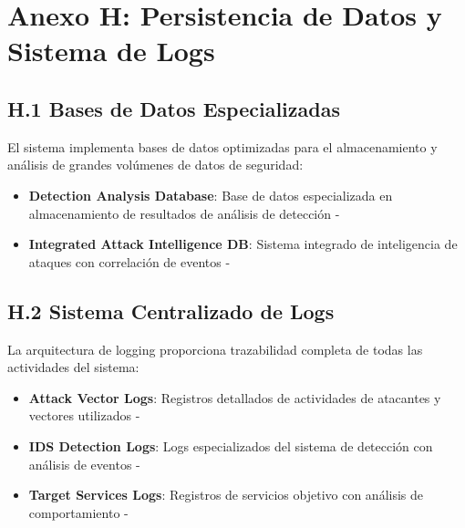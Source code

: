 \section*{Anexo H: Persistencia de Datos y Sistema de Logs}

\subsection*{H.1 Bases de Datos Especializadas}
El sistema implementa bases de datos optimizadas para el almacenamiento y análisis de grandes volúmenes de datos de seguridad:
\begin{itemize}
    \item \textbf{Detection Analysis Database}: Base de datos especializada en almacenamiento de resultados de análisis de detección - 
    \item \textbf{Integrated Attack Intelligence DB}: Sistema integrado de inteligencia de ataques con correlación de eventos - 
\end{itemize}

\subsection*{H.2 Sistema Centralizado de Logs}
La arquitectura de logging proporciona trazabilidad completa de todas las actividades del sistema:
\begin{itemize}
    \item \textbf{Attack Vector Logs}: Registros detallados de actividades de atacantes y vectores utilizados - 
    \item \textbf{IDS Detection Logs}: Logs especializados del sistema de detección con análisis de eventos - 
    \item \textbf{Target Services Logs}: Registros de servicios objetivo con análisis de comportamiento - 
\end{itemize}

